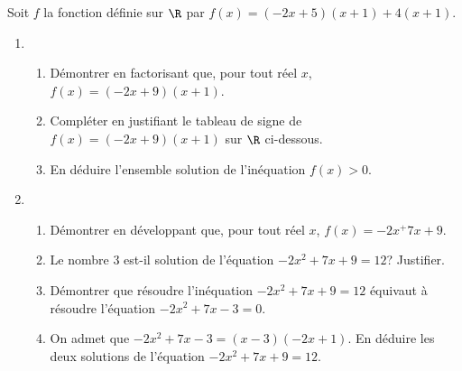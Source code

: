 \documentclass[a4paper]{article}
\begin{document}
  \medskip
  
  \begin{exerciceinterro}{}{}
  Soit $f$ la fonction définie sur $\R$ par $f(x)=(-2x+5)(x+1)+4(x+1)$.
  \begin{enumerate}
    \item \begin{enumerate}
      \item Démontrer en factorisant que, pour tout réel $x$, $f(x)=(-2x+9)(x+1)$.
      \item Compléter en justifiant le tableau de signe de $f(x)=(-2x+9)(x+1)$ sur $\R$ ci-dessous.
      \begin{center}
          \end{center}
      \item En déduire l'ensemble solution de l'inéquation $f(x)>0$.
    \end{enumerate}
    \item \begin{enumerate}
      \item Démontrer en développant que, pour tout réel $x$, $f(x)=-2x^+7x+9$.
      \item Le nombre $3$ est-il solution de l'équation $-2x^2+7x+9=12$? Justifier.
      \item Démontrer que résoudre l'inéquation $-2x^2+7x+9=12$ équivaut à résoudre l'équation $-2x^2+7x-3=0$.
      \item On admet que $-2x^2+7x-3=(x-3)(-2x+1)$. En déduire les deux solutions de l'équation $-2x^2+7x+9=12$.
    \end{enumerate}
  \end{enumerate}
  \end{exerciceinterro}
  
  \medskip
  
\end{document}

